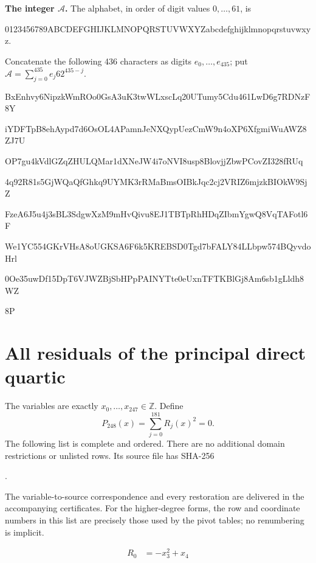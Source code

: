 \documentclass[11pt,letterpaper]{article}
\newcommand{\Z}{\mathbb Z}
\theoremstyle{definition}
\theoremstyle{remark}
\begin{document}
\textbf{The integer $\mathcal A$.}
The alphabet, in order of digit values $0,\ldots,61$, is\par
{\fontsize{10}{12}\selectfont\ttfamily 0123456789ABCDEFGHIJKLMNOPQRSTUVWXYZabcdefghijklmnopqrstuvwxyz}.\par
Concatenate the following 436 characters as digits $e_0,\ldots,e_{435}$;
put $\mathcal A=\sum_{j=0}^{435}e_j62^{435-j}$.\par
\begingroup\fontsize{10}{12}\selectfont\ttfamily
BxEnhvy6NipzkWmROo0GsA3uK3twWLxscLq20UTumy5Cdu461LwD6g7RDNzF8Y\par
iYDFTpB8ehAypd7d6OsOL4APamnJeNXQypUezCmW9n4oXP6XfgmiWuAWZ8ZJ7U\par
OP7gu4kVdlGZqZHULQMar1dXNeJW4i7oNVI8usp8BlovjjZbwPCovZI328fRUq\par
4q92R81s5GjWQaQfGhkq9UYMK3rRMaBmsOIBkJqc2cj2VRIZ6mjzkBIOkW9SjZ\par
FzeA6J5u4j3sBL3SdgwXzM9mHvQivu8EJ1TBTpRhHDqZIbmYgwQ8VqTAFotl6F\par
We1YC554GKrVHsA8oUGKSA6F6k5KREBSD0Tgd7bFALY84LLbpw574BQyvdoHrl\par
0Oe35uwDf15DpT6VJWZBjSbHPpPAINYTte0eUxnTFTKBlGj8Am6sb1gLldh8WZ\par
8P\par
\endgroup


\clearpage
\section{All residuals of the principal direct quartic}
\label{app:residuals}
The variables are exactly $x_0,\ldots,x_{247}\in\Z$.  Define
\[
 \boxed{\quad P_{248}(x)=\sum_{j=0}^{181}R_j(x)^2=0.\quad}
\]
The following list is complete and ordered.  There are no additional domain
restrictions or unlisted rows.  Its source file has SHA-256
\begin{center}\small
{}.
\end{center}
The variable-to-source correspondence and every restoration are delivered
in the accompanying certificates.  For the higher-degree forms, the row
and coordinate numbers in this list are precisely those used by the pivot
tables; no renumbering is implicit.

\begingroup
\small
\setlength{\abovedisplayskip}{5pt}
\setlength{\belowdisplayskip}{5pt}
\setlength{\jot}{2pt}
\begin{align*}
R_{0} &= -x_{3}^{2} +x_{4}
\end{align*}
\end{document}
